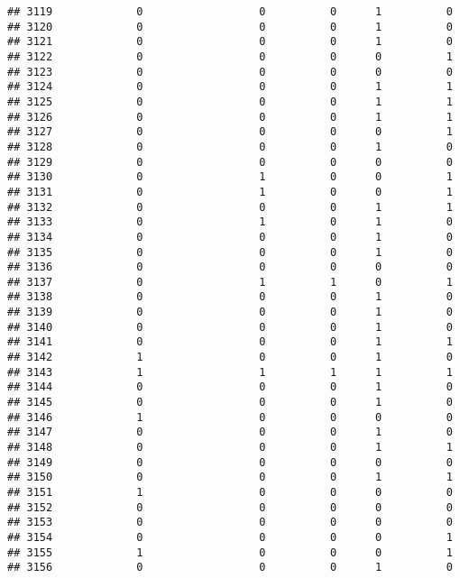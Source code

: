 \documentclass[
]{article}
\begin{document}
\begin{verbatim}
## 3119             0                  0          0      1          0
## 3120             0                  0          0      1          0
## 3121             0                  0          0      1          0
## 3122             0                  0          0      0          1
## 3123             0                  0          0      0          0
## 3124             0                  0          0      1          1
## 3125             0                  0          0      1          1
## 3126             0                  0          0      1          1
## 3127             0                  0          0      0          1
## 3128             0                  0          0      1          0
## 3129             0                  0          0      0          0
## 3130             0                  1          0      0          1
## 3131             0                  1          0      0          1
## 3132             0                  0          0      1          1
## 3133             0                  1          0      1          0
## 3134             0                  0          0      1          0
## 3135             0                  0          0      1          0
## 3136             0                  0          0      0          0
## 3137             0                  1          1      0          1
## 3138             0                  0          0      1          0
## 3139             0                  0          0      1          0
## 3140             0                  0          0      1          0
## 3141             0                  0          0      1          1
## 3142             1                  0          0      1          0
## 3143             1                  1          1      1          1
## 3144             0                  0          0      1          0
## 3145             0                  0          0      1          0
## 3146             1                  0          0      0          0
## 3147             0                  0          0      1          0
## 3148             0                  0          0      1          1
## 3149             0                  0          0      0          0
## 3150             0                  0          0      1          1
## 3151             1                  0          0      0          0
## 3152             0                  0          0      0          0
## 3153             0                  0          0      0          0
## 3154             0                  0          0      0          1
## 3155             1                  0          0      0          1
## 3156             0                  0          0      1          0

\end{verbatim}
\end{document}
